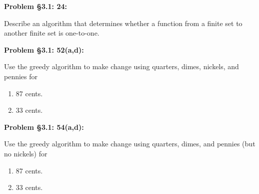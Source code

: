 \documentclass{article}
\newenvironment{problem}[1]
    {\begin{mdframed}[default]
    \textbf{Problem #1:}
    }
    {\end{mdframed}
    }
\begin{document}
\begin{problem}{\S 3.1: 24}
Describe an algorithm that determines whether a function from a finite set to another finite set is one-to-one.
\end{problem}

\begin{problem}{\S 3.1: 52(a,d)}
Use the greedy algorithm to make change using quarters, dimes, nickels, and pennies for
\begin{enumerate}
    \item[(a)] 87 cents.
    \item[(d)] 33 cents.
\end{enumerate}
\end{problem}

\begin{problem}{\S 3.1: 54(a,d)}
Use the greedy algorithm to make change using quarters, dimes, and pennies (but no nickels) for
\begin{enumerate}
    \item[(a)] 87 cents.
    \item[(d)] 33 cents.
\end{enumerate}
\end{problem}
\end{document}
